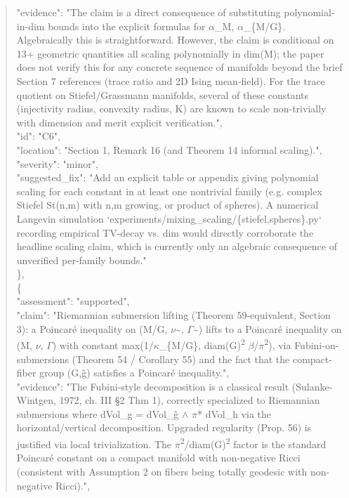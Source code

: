 \documentclass[11pt]{article}
\begin{document}
\begin{quote}
      "evidence": "The claim is a direct consequence of substituting polynomial-in-dim bounds into the explicit formulas for \ensuremath{\alpha}\_M, \ensuremath{\alpha}\_\{M/G\}. Algebraically this is straightforward. However, the claim is conditional on 13+ geometric quantities all scaling polynomially in dim(M); the paper does not verify this for any concrete sequence of manifolds beyond the brief Section 7 references (trace ratio and 2D Ising mean-field). For the trace quotient on Stiefel/Grassmann manifolds, several of these constants (injectivity radius, convexity radius, K) are known to scale non-trivially with dimension and merit explicit verification.",\\
      "id": "C6",\\
      "location": "Section 1, Remark 16 (and Theorem 14 informal scaling).",\\
      "severity": "minor",\\
      "suggested\_fix": "Add an explicit table or appendix giving polynomial scaling for each constant in at least one nontrivial family (e.g. complex Stiefel St(n,m) with n,m growing, or product of spheres). A numerical Langevin simulation `experiments/mixing\_scaling/\{stiefel,spheres\}.py` recording empirical TV-decay vs. dim would directly corroborate the headline scaling claim, which is currently only an algebraic consequence of unverified per-family bounds."\\
    \},\\
    \{\\
      "assessment": "supported",\\
      "claim": "Riemannian submersion lifting (Theorem 59-equivalent, Section 3): a Poincaré inequality on (M/G, \ensuremath{\nu}\~{}, \ensuremath{\Gamma}\~{}) lifts to a Poincaré inequality on (M, \ensuremath{\nu}, \ensuremath{\Gamma}) with constant max(1/\ensuremath{\kappa}\_\{M/G\}, diam(G)\textsuperscript{2} \ensuremath{\beta}/\ensuremath{\pi}\textsuperscript{2}), via Fubini-on-submersions (Theorem 54 / Corollary 55) and the fact that the compact-fiber group (G,ĝ) satisfies a Poincaré inequality.",\\
      "evidence": "The Fubini-style decomposition is a classical result (Sulanke-Wintgen, 1972, ch. III §2 Thm 1), correctly specialized to Riemannian submersions where dVol\_g = dVol\_ĝ \ensuremath{\wedge} \ensuremath{\pi}* dVol\_h via the horizontal/vertical decomposition. Upgraded regularity (Prop. 56) is justified via local trivialization. The \ensuremath{\pi}\textsuperscript{2}/diam(G)\textsuperscript{2} factor is the standard Poincaré constant on a compact manifold with non-negative Ricci (consistent with Assumption 2 on fibers being totally geodesic with non-negative Ricci).",\\

\end{quote}
\end{document}
